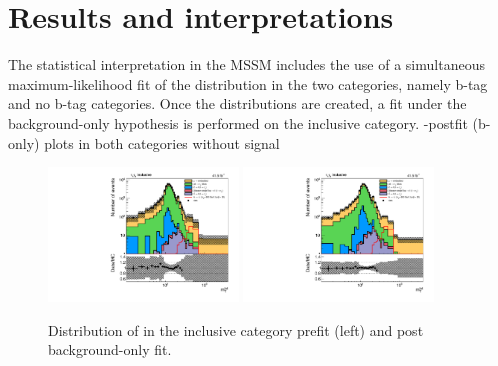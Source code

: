 \section{Results and interpretations}
\label{sec:analysis_results}

The statistical interpretation in the MSSM includes the use of a simultaneous maximum-likelihood fit of the \mttot distribution in the two categories, namely b-tag and no b-tag categories.  Once the \mttot distributions are created, a fit under the background-only hypothesis is performed on the inclusive category. 
-postfit (b-only) plots in both categories without signal

\begin{figure}
    \centering
    \includegraphics[width=0.45\textwidth]{Images/prefit_plots_tt_inclusive.pdf}
    \includegraphics[width=0.45\textwidth]{Images/postfit_b_plots_tt_inclusive.pdf}
    \caption{Distribution of \mttot in the inclusive category prefit (left) and post background-only fit.}
    \label{fig:control_plots}
\end{figure}

